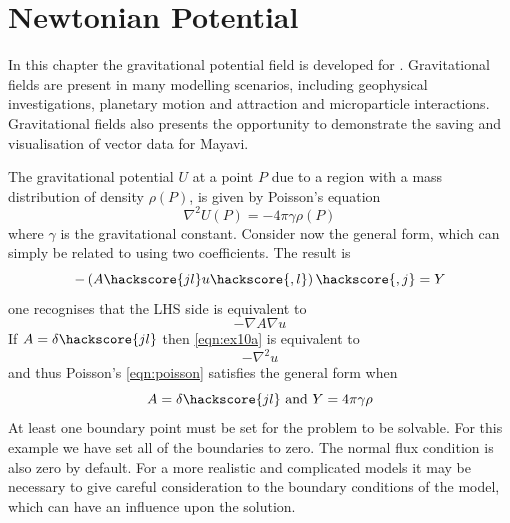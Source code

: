 
%
%
%

\section{Newtonian Potential}

In this chapter the gravitational potential field is developed for \esc.
Gravitational fields are present in many modelling scenarios, including
geophysical investigations, planetary motion and attraction and microparticle
interactions. Gravitational fields also presents the opportunity to demonstrate
the saving and visualisation of vector data for Mayavi.

The gravitational potential $U$ at a point $P$ due to a region with a mass
distribution of density $\rho(P)$, is given by Poisson's equation
\citep{Blakely1995}
\begin{equation} \label{eqn:poisson}
\nabla^2 U(P) = -4\pi\gamma\rho(P)
\end{equation}
where $\gamma$ is the gravitational constant.
Consider now the \esc general form, which can simply be related to
 using two coefficients. The result is
\begin{equation}
-\left(A\hackscore{jl} u\hackscore{,l} \right)\hackscore{,j} = Y
\end{equation}
one recognises that the LHS side is equivalent to 
\begin{equation} \label{eqn:ex10a}
-\nabla A \nabla u
\end{equation}
If $A=\delta\hackscore{jl}$ then \autoref{eqn:ex10a} is equivalent to
\begin{equation*}
-\nabla^2 u
\end{equation*}
and thus Poisson's \autoref{eqn:poisson} satisfies the general form when
\begin{equation}
A=\delta\hackscore{jl} \text{ and } Y= 4\pi\gamma\rho
\end{equation}
At least one boundary point must be set for the problem to be solvable. For this
example we have set all of the boundaries to zero. The normal flux condition is
also zero by default. For a more realistic and complicated models it may be
necessary to give careful consideration to the boundary conditions of the model,
which can have an influence upon the solution.

